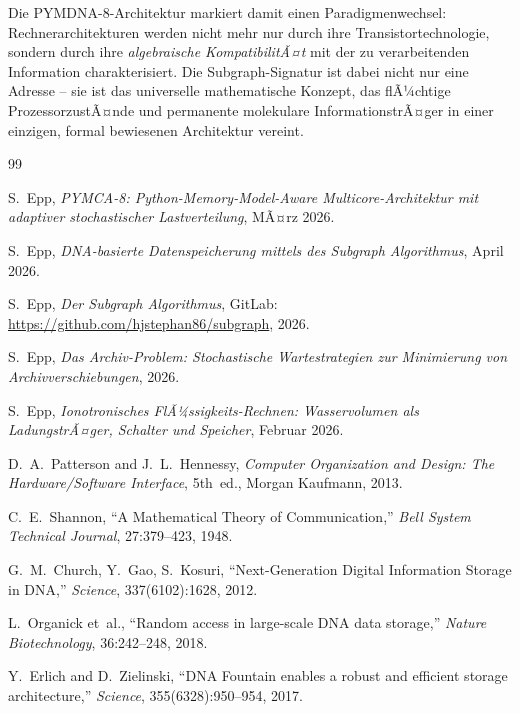﻿\documentclass[a4paper,12pt]{article}
\theoremstyle{definition}
\begin{document}
Die PYMDNA-8-Architektur markiert damit einen Paradigmenwechsel:
Rechnerarchitekturen werden nicht mehr nur durch ihre
Transistortechnologie, sondern durch ihre \emph{algebraische KompatibilitÃ¤t}
mit der zu verarbeitenden Information charakterisiert.
Die Subgraph-Signatur ist dabei nicht nur eine Adresse -- sie ist das
universelle mathematische Konzept, das flÃ¼chtige ProzessorzustÃ¤nde
und permanente molekulare InformationstrÃ¤ger in einer einzigen, formal
bewiesenen Architektur vereint.

\begin{thebibliography}{99}

  S.~Epp,
  \textit{PYMCA-8: Python-Memory-Model-Aware Multicore-Architektur mit
    adaptiver stochastischer Lastverteilung}, MÃ¤rz 2026.

  S.~Epp,
  \textit{DNA-basierte Datenspeicherung mittels des Subgraph Algorithmus}, April 2026.

  S.~Epp,
  \textit{Der Subgraph Algorithmus},
  GitLab: \url{https://github.com/hjstephan86/subgraph}, 2026.

  S.~Epp,
  \textit{Das Archiv-Problem: Stochastische Wartestrategien zur Minimierung
    von Archivverschiebungen}, 2026.

  S.~Epp,
  \textit{Ionotronisches FlÃ¼ssigkeits-Rechnen: Wasservolumen als
    LadungstrÃ¤ger, Schalter und Speicher}, Februar 2026.

  D.~A.~Patterson and J.~L.~Hennessy,
  \textit{Computer Organization and Design: The Hardware/Software Interface},
  5th~ed., Morgan Kaufmann, 2013.

  C.~E.~Shannon,
  ``A Mathematical Theory of Communication,''
  \textit{Bell System Technical Journal}, 27:379--423, 1948.

  G.~M.~Church, Y.~Gao, S.~Kosuri,
  ``Next-Generation Digital Information Storage in DNA,''
  \textit{Science}, 337(6102):1628, 2012.

  L.~Organick et~al.,
  ``Random access in large-scale DNA data storage,''
  \textit{Nature Biotechnology}, 36:242--248, 2018.

  Y.~Erlich and D.~Zielinski,
  ``DNA Fountain enables a robust and efficient storage architecture,''
  \textit{Science}, 355(6328):950--954, 2017.


\end{thebibliography}
\end{document}

